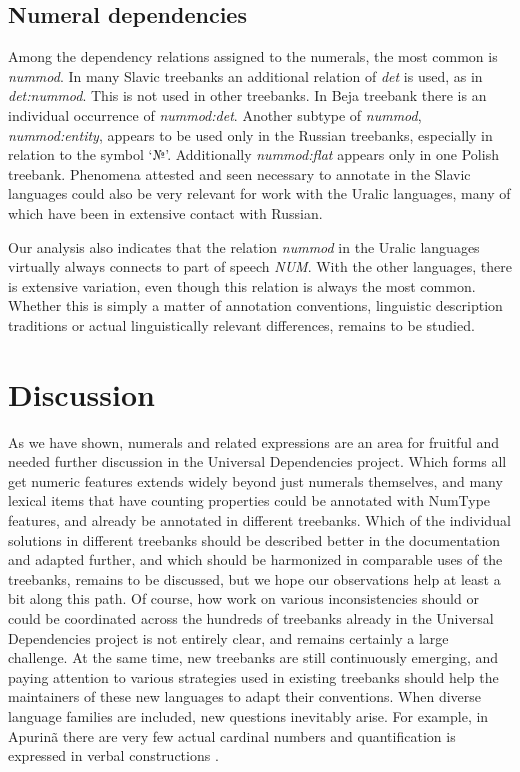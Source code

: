 \documentclass[free]{flammie}
\begin{document}
\subsection{Numeral dependencies}

Among the dependency relations assigned to the numerals, the most common is
\textit{nummod}. In many Slavic treebanks an additional relation of \textit{det}
is used, as in \textit{det:nummod}. This is not used in other treebanks. In Beja
treebank there is an individual occurrence of \textit{nummod:det}. Another
subtype of \textit{nummod}, \textit{nummod:entity}, appears to be used only in
the Russian treebanks, especially in relation to the symbol `№'. Additionally
\textit{nummod:flat} appears only in one Polish treebank. Phenomena attested and
seen necessary to annotate in the Slavic languages could also be very relevant
for work with the Uralic languages, many of which have been in extensive contact
with Russian.

Our analysis also indicates that the relation \textit{nummod} in the Uralic
languages virtually always connects to part of speech \textit{NUM}. With the
other languages, there is extensive variation, even though this relation is
always the most common. Whether this is simply a matter of annotation
conventions, linguistic description traditions or actual linguistically relevant
differences, remains to be studied.

\section{Discussion}

As we have shown, numerals and related expressions are an area for fruitful and
needed further discussion in the Universal Dependencies project. Which forms all
get numeric features extends widely beyond just numerals themselves, and many
lexical items that have counting properties could be annotated with NumType
features, and already be annotated in different treebanks. Which of the
individual solutions in different treebanks should be described better in the
documentation and adapted further, and which should be harmonized in comparable
uses of the treebanks, remains to be discussed, but we hope our observations
help at least a bit along this path. Of course, how work on various
inconsistencies should or could be coordinated across the hundreds of treebanks
already in the Universal Dependencies project is not entirely clear, and remains
certainly a large challenge. At the same time, new treebanks are still
continuously emerging, and paying attention to various strategies used in
existing treebanks should help the maintainers of these new languages to adapt
their conventions. When diverse language families are included, new questions
inevitably arise. For example, in Apurinã there are very few actual cardinal
numbers and quantification is expressed in verbal constructions
\cite{facundes2021numexpr,rueter2021apurina}.
\end{document}
